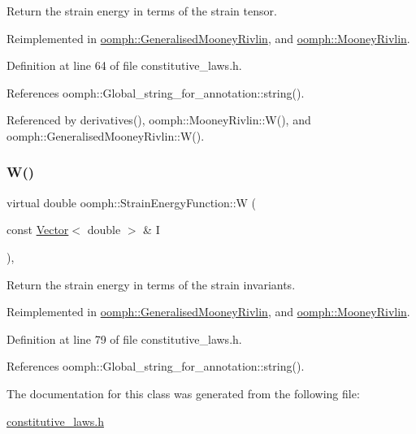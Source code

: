 Return the strain energy in terms of the strain tensor. 



Reimplemented in \hyperlink{classoomph_1_1GeneralisedMooneyRivlin_a91ff4fa7c19304c98f9a0017c22747a9}{oomph\+::\+Generalised\+Mooney\+Rivlin}, and \hyperlink{classoomph_1_1MooneyRivlin_a9411c5fbb920d071e83a9e52fb8b60d1}{oomph\+::\+Mooney\+Rivlin}.



Definition at line 64 of file constitutive\+\_\+laws.\+h.



References oomph\+::\+Global\+\_\+string\+\_\+for\+\_\+annotation\+::string().



Referenced by derivatives(), oomph\+::\+Mooney\+Rivlin\+::\+W(), and oomph\+::\+Generalised\+Mooney\+Rivlin\+::\+W().

\mbox{\label{classoomph_1_1StrainEnergyFunction_a99df34610d4542568f65c568ae3a908f}} 
\subsubsection{\texorpdfstring{W()}{W()}\hspace{0.1cm}{\footnotesize\ttfamily [2/2]}}
{\footnotesize\ttfamily virtual double oomph\+::\+Strain\+Energy\+Function\+::W (\begin{DoxyParamCaption}\item[{const \hyperlink{classoomph_1_1Vector}{Vector}$<$ double $>$ \&}]{I }\end{DoxyParamCaption})\hspace{0.3cm}{\ttfamily [inline]}, {\ttfamily [virtual]}}



Return the strain energy in terms of the strain invariants. 



Reimplemented in \hyperlink{classoomph_1_1GeneralisedMooneyRivlin_a2edff387e97632febd90938b27a30a14}{oomph\+::\+Generalised\+Mooney\+Rivlin}, and \hyperlink{classoomph_1_1MooneyRivlin_aa610beb4e7b06dc3aa57bbc552ca0b80}{oomph\+::\+Mooney\+Rivlin}.



Definition at line 79 of file constitutive\+\_\+laws.\+h.



References oomph\+::\+Global\+\_\+string\+\_\+for\+\_\+annotation\+::string().



The documentation for this class was generated from the following file\+:\begin{DoxyCompactItemize}
\item 
\hyperlink{constitutive__laws_8h}{constitutive\+\_\+laws.\+h}\end{DoxyCompactItemize}
